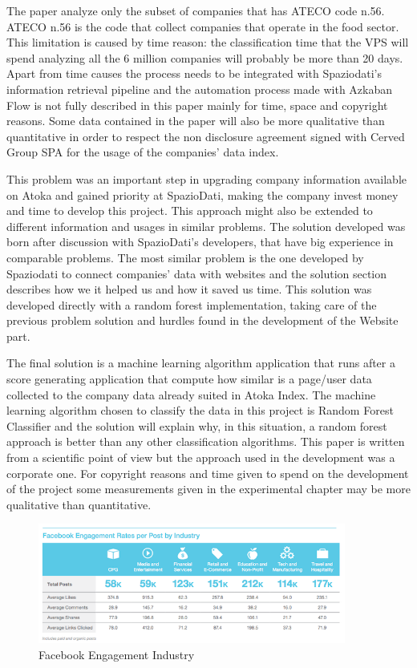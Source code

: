The paper analyze only the subset of companies that has ATECO code n.56. ATECO n.56 is the code that collect companies that operate in the food sector\cite{istat}. This limitation is caused by time reason: the classification time that the VPS will spend analyzing all the 6 million companies will probably be more than 20 days. Apart from time causes the process needs to be integrated with Spaziodati's information retrieval pipeline and the automation process made with Azkaban Flow is not fully described in this paper mainly for time, space and copyright reasons. Some data contained in the paper will also be more qualitative than quantitative in order to respect the non disclosure agreement signed with Cerved Group SPA for the usage of the companies' data index.

This problem was an important step in upgrading company information available on Atoka and gained priority at SpazioDati, making the company invest money and time to develop this project. This approach might also be extended to different information and usages in similar problems.
The solution developed was born after discussion with SpazioDati's developers, that have big experience in comparable problems. The most similar problem is the one developed by Spaziodati to connect companies' data with websites and the solution section describes how we it helped us and how it saved us time. This solution was developed directly with a random forest implementation, taking care of the previous problem solution and hurdles found in the development of the Website part.

The final solution is a machine learning algorithm application that runs after a score generating application that compute how similar is a page/user data collected to the company data already suited in Atoka Index. The machine learning algorithm chosen to classify the data in this project is Random Forest Classifier and the solution will explain why, in this situation, a random forest approach is better than any other classification algorithms. This paper is written from a scientific point of view but the approach used in the development was a corporate one. For copyright reasons and time given to spend on the development of the project some measurements given in the experimental chapter may be more qualitative than quantitative.

\begin{figure}
\centering
\includegraphics[width=0.9\textwidth]{img/fb_eng.png}
\caption{Facebook Engagement Industry}
\label{Fig.1}
\end{figure}


